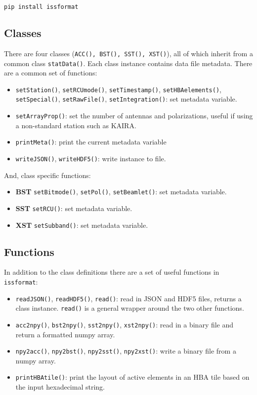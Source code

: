 \documentclass[10pt,a4paper]{article}
\begin{document}
\begin{verbatim}
pip install issformat
\end{verbatim}

\subsection{Classes}

There are four classes (\texttt{ACC(), BST(), SST(), XST()}), all of which
inherit from a common class \texttt{statData()}. Each class instance contains
data file metadata. There are a common set of functions:

\begin{itemize}
    \item \texttt{setStation()}, \texttt{setRCUmode()}, \texttt{setTimestamp()},
    \texttt{setHBAelements()}, \texttt{setSpecial()}, \texttt{setRawFile()},
    \texttt{setIntegration()}: set metadata variable.
    \item \texttt{setArrayProp()}: set the number of antennas and polarizations,
    useful if using a non-standard station such as KAIRA.
    \item \texttt{printMeta()}: print the current metadata variable
    \item \texttt{writeJSON()}, \texttt{writeHDF5()}: write instance to file.
\end{itemize}

\noindent And, class specific functions:

\begin{itemize}
    \item \textbf{BST} \texttt{setBitmode()}, \texttt{setPol()},
    \texttt{setBeamlet()}: set metadata variable.
    \item \textbf{SST} \texttt{setRCU()}: set metadata variable.
    \item \textbf{XST} \texttt{setSubband()}: set metadata variable.
\end{itemize}

\subsection{Functions}

In addition to the class definitions there are a set of useful functions in
\texttt{issformat}:

\begin{itemize}
    \item \texttt{readJSON()}, \texttt{readHDF5()}, \texttt{read()}: read in
    JSON and HDF5 files, returns a class instance. \texttt{read()} is a general
    wrapper around the two other functions.
    \item \texttt{acc2npy()}, \texttt{bst2npy()}, \texttt{sst2npy()},
    \texttt{xst2npy()}: read in a binary file and return a formatted numpy
    array.
    \item \texttt{npy2acc()}, \texttt{npy2bst()}, \texttt{npy2sst()},
    \texttt{npy2xst()}: write a binary file from a numpy array.
    \item \texttt{printHBAtile()}: print the layout of active elements in an HBA
    tile based on the input hexadecimal string.
\end{itemize}
\end{document}
